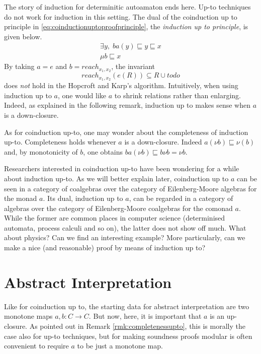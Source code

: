 \documentclass[smallcondensed,envcountsect,envcountsame]{svjour3}     %
\begin{document}
The story of induction for determinitic autoamaton ends here. Up-to techniques do not work for induction in this setting. The dual of the coinduction up to principle in \eqref{eq:coinductionuptoproofprinciple}, the \emph{induction up to principle}, is given below.
\begin{equation}\label{eq:inductionuptoproofprinciple}
 \begin{array}{c}
    \exists y, \;  ba(y) \sqsubseteq y\sqsubseteq x \\
    \hline %
    \mu b \sqsubseteq x
\end{array}
\end{equation}
By taking $a=e$ and $b= reach_{x_1,x_2}$, the invariant 
$$reach_{x_1,x_2}(e(R)) \subseteq R\cup todo $$
does \emph{not} hold in the Hopcroft and Karp's algorithm. Intuitively, when using induction up to $a$, one would like $a$ to shrink relations rather than enlarging. Indeed, as explained in the following remark, induction up to makes sense when $a$ is a down-closure.
\begin{remark}
As for coinduction up-to, one may wonder about the completeness of induction up-to. Completeness holds whenever $a$ is a down-closure. Indeed $a(\nu b)\sqsubseteq \nu(b)$ and, by monotonicity of $b$, one obtains $ba(\nu b)\sqsubseteq b\nu b  = \nu b $.
\end{remark}

\begin{question}
Researchers interested in coinduction up-to have been wondering for a while about induction up-to. As we will better explain later, coinduction up to $a$ can be seen in a category of coalgebras over the category of Eilenberg-Moore algebras for the monad $a$. Its dual, induction up to $a$, can be regarded in a  category of algebras over the category of Eilenberg-Moore coalgebras for the comonad $a$. While the former are common places in computer science (determinised automata, process calculi and so on), the latter does not show off much. What about physics? Can we find an interesting example? More particularly, can we make a nice (and reasonable) proof by means of induction up to? 
\end{question}



\section{Abstract Interpretation}
Like for coinduction up to, the starting data for abstract interpretation are two monotone maps $a,b\colon C \to C$. But now, here, it is important that $a$ is an up-closure. As pointed out in Remark \ref{rmk:completenessupto}, this is morally the case also for up-to techniques, but for making soundness proofs modular is often convenient to require $a$ to be just a monotone map.
\end{document}
